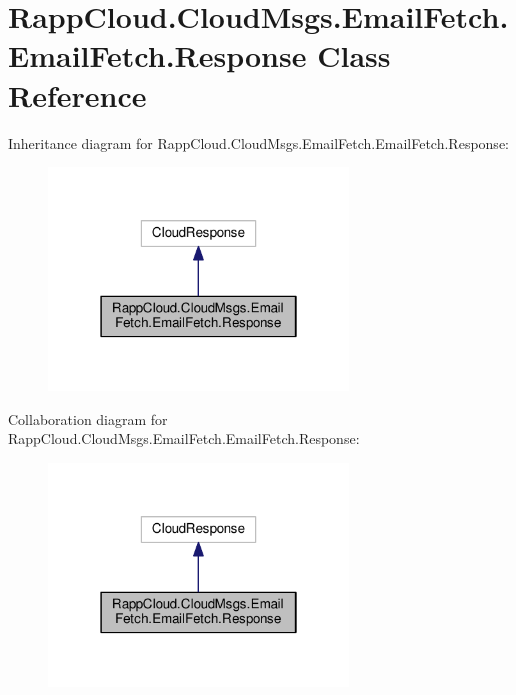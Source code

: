\hypertarget{classRappCloud_1_1CloudMsgs_1_1EmailFetch_1_1EmailFetch_1_1Response}{\section{Rapp\-Cloud.\-Cloud\-Msgs.\-Email\-Fetch.\-Email\-Fetch.\-Response Class Reference}
\label{classRappCloud_1_1CloudMsgs_1_1EmailFetch_1_1EmailFetch_1_1Response}
}


Inheritance diagram for Rapp\-Cloud.\-Cloud\-Msgs.\-Email\-Fetch.\-Email\-Fetch.\-Response\-:
\nopagebreak
\begin{figure}[H]
\begin{center}
\leavevmode
\includegraphics[width=226pt]{classRappCloud_1_1CloudMsgs_1_1EmailFetch_1_1EmailFetch_1_1Response__inherit__graph}
\end{center}
\end{figure}


Collaboration diagram for Rapp\-Cloud.\-Cloud\-Msgs.\-Email\-Fetch.\-Email\-Fetch.\-Response\-:
\nopagebreak
\begin{figure}[H]
\begin{center}
\leavevmode
\includegraphics[width=226pt]{classRappCloud_1_1CloudMsgs_1_1EmailFetch_1_1EmailFetch_1_1Response__coll__graph}
\end{center}
\end{figure}

